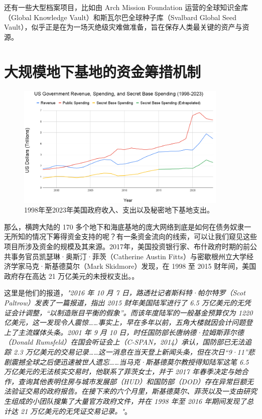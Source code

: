 \documentclass[10pt,twocolumn,letterpaper]{article}
\begin{document}
还有一些大型档案项目，比如由 Arch Mission Foundation 运营的全球知识金库（Global Knowledge Vault）\cite{29}和斯瓦尔巴全球种子库（Svalbard Global Seed Vault）\cite{30}，似乎正是在为一场灭绝级灾难做准备，旨在保存人类最关键的资产与资源。

\section{大规模地下基地的资金筹措机制}
\begin{figure}[t]
\begin{center}
\includegraphics[width=0.9\textwidth]{govcrop2.png}
\end{center}
   \caption{1998年至2023年美国政府收入、支出以及秘密地下基地支出\cite{19}。}
   \label{fig:9}
\end{figure}

那么，横跨大陆的 170 多个地下和海底基地的庞大网络到底是如何在债务奴隶一无所知的情况下筹得资金支持的呢？有一条资金流向的线索，可以让我们窥见这些项目所涉及资金的规模及其来源。2017年，美国投资银行家、布什政府时期的前公共事务官员凯瑟琳·奥斯汀·菲茨（Catherine Austin Fitts）与密歇根州立大学经济学家马克·斯基德莫尔（Mark Skidmore）发现，在 1998 至 2015 财年间，美国政府存在高达 21 万亿美元的未授权支出。\cite{11,12,13}。

这里是他们的报道，\textit{"2016 年 10 月 7 日，路透社记者斯科特·帕尔特罗（Scot Paltrow）发表了一篇报道，指出 2015 财年美国陆军进行了 6.5 万亿美元的无凭证会计调整，“以制造账目平衡的假象”。而该年度陆军的一般基金预算仅为 1220 亿美元，这一发现令人震惊……事实上，早在多年以前，五角大楼就因会计问题登上了主流媒体头条。2001 年 9 月 10 日，时任国防部长唐纳德·拉姆斯菲尔德（Donald Rumsfeld）在国会听证会上（C-SPAN，2014）承认，国防部已无法追踪 2.3 万亿美元的交易记录……这一消息在当天登上新闻头条，但在次日“9·11”悲剧震撼全球之后便迅速被世人遗忘……当马克·斯基德莫尔教授得知陆军这笔 6.5 万亿美元的无法核实交易时，他联系了菲茨女士，并于 2017 年春季决定与她合作，查询其他表明住房与城市发展部（HUD）和国防部（DOD）存在异常巨额无法验证交易的政府报告。在接下来的六个月里，斯基德莫尔、菲茨以及一支由研究生组成的小团队搜集了大量官方政府文件，并在 1998 年至 2016 年期间发现了总计达 21 万亿美元的无凭证交易记录。"}\cite{12}。
\end{document}
